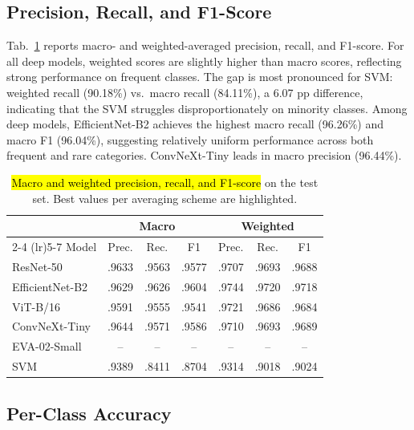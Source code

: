 \subsection{Precision, Recall, and F1-Score}

Tab.~\ref{tab:detailed_metrics} reports macro- and weighted-averaged precision, recall, and F1-score. For all deep models, weighted scores are slightly higher than macro scores, reflecting strong performance on frequent classes. The gap is most pronounced for SVM: weighted recall (90.18\%) vs.\ macro recall (84.11\%), a 6.07 pp difference, indicating that the SVM struggles disproportionately on minority classes. Among deep models, EfficientNet-B2 achieves the highest macro recall (96.26\%) and macro F1 (96.04\%), suggesting relatively uniform performance across both frequent and rare categories. ConvNeXt-Tiny leads in macro precision (96.44\%).

\begin{table}[t]
\centering
\caption{\hl{Macro and weighted precision, recall, and F1-score} on the test set. Best values per averaging scheme are highlighted.}
\label{tab:detailed_metrics}
\setlength{\tabcolsep}{3.5pt}
\small
\begin{tabular}{lcccccc}
\toprule
 & \multicolumn{3}{c}{Macro} & \multicolumn{3}{c}{Weighted} \\
\cmidrule(lr){2-4} \cmidrule(lr){5-7}
Model & Prec. & Rec. & F1 & Prec. & Rec. & F1 \\
\midrule
ResNet-50       & .9633 & .9563 & .9577 & .9707 & .9693 & .9688 \\
EfficientNet-B2 & .9629 & \cellcolor{blue!8}.9626 & \cellcolor{blue!8}.9604 & \cellcolor{blue!8}.9744 & \cellcolor{blue!8}.9720 & \cellcolor{blue!8}.9718 \\
ViT-B/16        & .9591 & .9555 & .9541 & .9721 & .9686 & .9684 \\
ConvNeXt-Tiny   & \cellcolor{blue!8}.9644 & .9571 & .9586 & .9710 & .9693 & .9689 \\
EVA-02-Small    & --    & --    & --    & --    & --    & -- \\
SVM             & .9389 & .8411 & .8704 & .9314 & .9018 & .9024 \\
\bottomrule
\end{tabular}
\end{table}

\subsection{Per-Class Accuracy}

